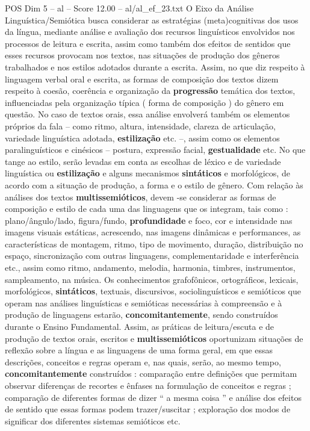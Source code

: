 \begin{textsample}{POS Dim 5 – al – Score 12.00 – al/al\_ef\_23.txt}  \label{ex:f5_pos_041}
O Eixo da Análise Linguística/Semiótica busca considerar as estratégias (meta)cognitivas dos usos da língua, mediante análise e avaliação dos recursos linguísticos envolvidos nos processos de leitura e escrita, assim como também dos efeitos de sentidos que esses recursos provocam nos textos, nas situações de produção dos gêneros trabalhados e nos estilos adotados durante a escrita.
Assim, no que diz respeito à linguagem verbal oral e escrita, as formas de composição dos textos dizem respeito à coesão, coerência e organização da \textbf{progressão} temática dos textos, influenciadas pela organização típica ( forma de composição ) do gênero em questão.
No caso de textos orais, essa análise envolverá também os elementos próprios da fala – como ritmo, altura, intensidade, clareza de articulação, variedade linguística adotada, \textbf{estilização} etc. –, assim como os elementos paralinguísticos e cinésicos – postura, expressão facial, \textbf{gestualidade} etc.
No que tange ao estilo, serão levadas em conta as escolhas de léxico e de variedade linguística ou \textbf{estilização} e alguns mecanismos \textbf{sintáticos} e morfológicos, de acordo com a situação de produção, a forma e o estilo de gênero.
Com relação às análises dos textos \textbf{multissemióticos}, devem -se considerar as formas de composição e estilo de cada uma das linguagens que os integram, tais como : plano/ângulo/lado, figura/fundo, \textbf{profundidade} e foco, cor e intensidade nas imagens visuais estáticas, acrescendo, nas imagens dinâmicas e performances, as características de montagem, ritmo, tipo de movimento, duração, distribuição no espaço, sincronização com outras linguagens, complementaridade e interferência etc., assim como ritmo, andamento, melodia, harmonia, timbres, instrumentos, sampleamento, na música.
Os conhecimentos grafofônicos, ortográficos, lexicais, morfológicos, \textbf{sintáticos}, textuais, discursivos, sociolinguísticos e semióticos que operam nas análises linguísticas e semióticas necessárias à compreensão e à produção de linguagens estarão, \textbf{concomitantemente}, sendo construídos durante o Ensino Fundamental.
Assim, as práticas de leitura/escuta e de produção de textos orais, escritos e \textbf{multissemióticos} oportunizam situações de reflexão sobre a língua e as linguagens de uma forma geral, em que essas descrições, conceitos e regras operam e, nas quais, serão, ao mesmo tempo, \textbf{concomitantemente} construídos : comparação entre definições que permitam observar diferenças de recortes e ênfases na formulação de conceitos e regras ; comparação de diferentes formas de dizer “ a mesma coisa ” e análise dos efeitos de sentido que essas formas podem trazer/suscitar ; exploração dos modos de significar dos diferentes sistemas semióticos etc.

\end{textsample}

